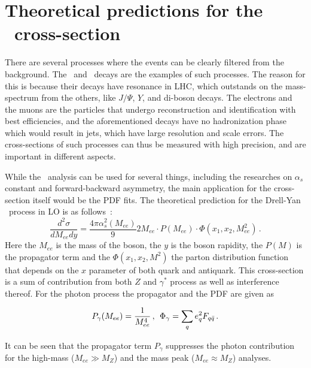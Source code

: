 \section{Theoretical predictions for the \Zee\ cross-section}

There are several processes where the events can be clearly filtered from the background. The \Wenu\ and \Zee\ decays are the examples of such processes. The reason for this is because their decays have resonance in LHC, which outstands on the mass-spectrum from the others, like $J/\Psi$, $Y$, and di-boson decays. The electrons and the muons are the particles that undergo reconstruction and identification with best efficiencies, and the aforementioned decays have no hadronization phase which would result in jets, which have large resolution and scale errors. The cross-sections of such processes can thus be measured with high precision, and are important in different aspects.

While the \Zee\ analysis can be used for several things, including the researches on $\alpha_{s}$ constant and forward-backward asymmetry, the main application for the cross-section itself would be the PDF fits. The theoretical prediction for the Drell-Yan \Zgee\ process in LO is as follows~\cite{lib:theory_Z-c-s}:
\begin{equation}
\label{eq:theory_c-s}
\frac{d^{2}\sigma}{dM_{ee}dy} = \frac{4\pi\alpha^{2}_{s}(M_{ee})}{9}2M_{ee}\cdot P(M_{ee})\cdot\Phi(x_{1},x_{2},M^{2}_{ee})\,.
\end{equation}
Here the $M_{ee}$ is the mass of the boson, the $y$ is the boson rapidity, the $P(M)$ is the propagator term and the $\Phi(x_{1},x_{2},M^{2})$ the parton distribution function that depends on the $x$ parameter of both quark and antiquark. This cross-section is a sum of contribution from both $Z$ and $\gamma^*$ process as well as interference thereof. For the photon process the propagator and the PDF are given as

\begin{equation}
P_{\gamma}(M_{ee}) = \frac{1}{M^{4}_{ee}}\,,\,\;\Phi_{\gamma} = \sum_{q} e^{2}_{q} F_{q\bar{q}} \,.
\end{equation}

It can be seen that the propagator term $P_{\gamma}$ suppresses the photon contribution for the high-mass ($M_{ee} \gg M_{Z}$) and the mass peak ($M_{ee} \approx M_{Z}$) analyses.


